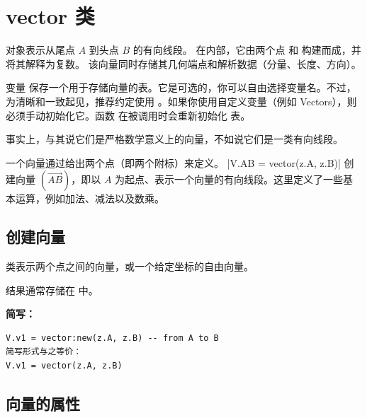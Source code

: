 \newpage

\section{vector 类}
\label{sec:class_vector}

 对象表示从尾点 $A$ 到头点 $B$ 的有向线段。
在内部，它由两个点  和  构建而成，并将其解释为复数。
该向量同时存储其几何端点和解析数据（分量、长度、方向）。



变量  保存一个用于存储向量的表。它是可选的，你可以自由选择变量名。不过，为清晰和一致起见，推荐约定使用 。如果你使用自定义变量（例如 Vectors），则必须手动初始化它。函数  在被调用时会重新初始化  表。

\vspace{1em}
事实上，与其说它们是严格数学意义上的向量，不如说它们是一类有向线段。

一个向量通过给出两个点（即两个附标）来定义。
|V.AB = vector(z.A, z.B)| 创建向量 $(\overrightarrow{AB})$，即以 $A$ 为起点、表示一个向量的有向线段。这里定义了一些基本运算，例如加法、减法以及数乘。


\subsection{创建向量}
\label{sub:creating_a_vector}

 类表示两个点之间的向量，或一个给定坐标的自由向量。

\medskip
结果通常存储在  中。

\medskip
\textbf{简写：}
\begin{mybox}
\begin{verbatim}
V.v1 = vector:new(z.A, z.B) -- from A to B
简写形式与之等价：
V.v1 = vector(z.A, z.B)
\end{verbatim}
\end{mybox}



\subsection{向量的属性}

\vspace{1em}

